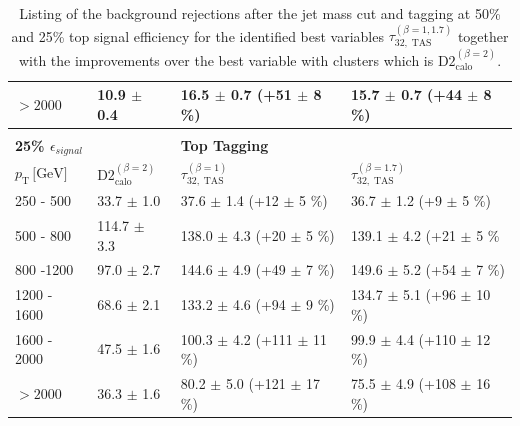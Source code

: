 \begin{table}
\begin{tabular}{llll}
\multicolumn{1}{l||}{$>2000$}                     	  & \multicolumn{1}{l|}{10.9 $\pm$ 0.4}                      & \multicolumn{1}{l|}{16.5 $\pm$ 0.7 (+51 $\pm$ 8 \%)}        & \multicolumn{1}{l|}{15.7 $\pm$ 0.7 (+44 $\pm$ 8 \%)}       \\ \hline
                                                     &                                                &                                          &                                          \\
 \multicolumn{1}{l||}{\textbf{25\% $\epsilon_{signal}$}} &                                                &  \textbf{Top Tagging}                                        &                                          \\ \hline
\multicolumn{1}{l||}{$p_{\mathrm{T}} \, \text{[GeV]}$}           & \multicolumn{1}{l|}{$\text{D2}_{\text{calo}}^{(\beta=2)}$} & \multicolumn{1}{l|}{$\tau_{32,\;\text{TAS}}^{(\beta=1)}$} & \multicolumn{1}{l|}{$\tau_{32,\;\text{TAS}}^{(\beta=1.7)}$} \\ \hline \hline
\multicolumn{1}{l||}{250 - 500}                       & \multicolumn{1}{l|}{33.7 $\pm$ 1.0}                     & \multicolumn{1}{l|}{37.6 $\pm$ 1.4 (+12 $\pm$ 5 \%)}       & \multicolumn{1}{l|}{36.7 $\pm$ 1.2 (+9 $\pm$ 5 \%)}       \\
\multicolumn{1}{l||}{500 - 800}                       & \multicolumn{1}{l|}{114.7 $\pm$ 3.3}                    & \multicolumn{1}{l|}{138.0 $\pm$ 4.3 (+20 $\pm$ 5 \%)}       & \multicolumn{1}{l|}{139.1 $\pm$ 4.2 (+21 $\pm$ 5 \%}        \\
\multicolumn{1}{l||}{800 -1200}                       & \multicolumn{1}{l|}{97.0 $\pm$ 2.7}                     & \multicolumn{1}{l|}{144.6 $\pm$ 4.9 (+49 $\pm$ 7 \%)}       & \multicolumn{1}{l|}{149.6 $\pm$ 5.2 (+54 $\pm$ 7 \%)}       \\
\multicolumn{1}{l||}{1200 - 1600}                     & \multicolumn{1}{l|}{68.6 $\pm$ 2.1}                     & \multicolumn{1}{l|}{133.2 $\pm$ 4.6 (+94 $\pm$ 9 \%)}       & \multicolumn{1}{l|}{134.7 $\pm$ 5.1 (+96 $\pm$ 10 \%)}      \\
\multicolumn{1}{l||}{1600 - 2000}                     & \multicolumn{1}{l|}{47.5 $\pm$ 1.6}                     & \multicolumn{1}{l|}{100.3 $\pm$ 4.2 (+111 $\pm$ 11 \%)}      & \multicolumn{1}{l|}{99.9 $\pm$ 4.4 (+110 $\pm$ 12 \%)}       \\ 
\multicolumn{1}{l||}{$>2000$}                         & \multicolumn{1}{l|}{36.3 $\pm$ 1.6}                     & \multicolumn{1}{l|}{80.2 $\pm$ 5.0 (+121 $\pm$ 17 \%)}      & \multicolumn{1}{l|}{75.5 $\pm$ 4.9 (+108 $\pm$ 16 \%)}       \\ \hline
\end{tabular}
\caption{Listing of the background rejections after the jet mass cut and tagging at 50\% and 25\% top signal efficiency for the identified best variables $\tau_{32,\;\text{TAS}}^{(\beta=1,1.7)}$ together with the improvements over the best variable with clusters which is $\text{D2}_{\text{calo}}^{(\beta=2)}$.}\label{table:top_improvement}
\end{table}



